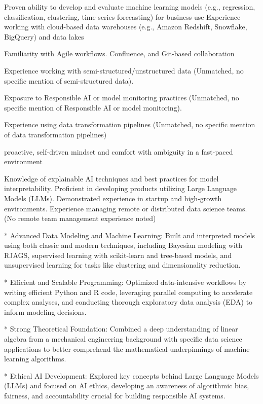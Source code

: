 
Proven ability to develop and evaluate machine learning models (e.g., regression, classification, clustering, time-series forecasting) for business use
Experience working with cloud-based data warehouses (e.g., Amazon Redshift, Snowflake, BigQuery) and data lakes

Familiarity with Agile workflows. Confluence, and Git-based collaboration

Experience working with semi-structured/unstructured data (Unmatched, no specific mention of semi-structured data).

Exposure to Responsible AI or model monitoring practices (Unmatched, no specific mention of Responsible AI or model monitoring).

Experience using data transformation pipelines (Unmatched, no specific mention of data transformation pipelines)

proactive, self-driven mindset and comfort with ambiguity in a fast-paced environment

Knowledge of explainable AI techniques and best practices for model interpretability. Proficient in developing products utilizing Large Language Models (LLMs). Demonstrated experience in startup and high-growth environments. Experience managing remote or distributed data science teams. (No remote team management experience noted)


 * Advanced Data Modeling and Machine Learning: Built and interpreted models using both classic and modern techniques, including Bayesian modeling with RJAGS, supervised learning with scikit-learn and tree-based models, and unsupervised learning for tasks like clustering and dimensionality reduction.
 
 * Efficient and Scalable Programming: Optimized data-intensive workflows by writing efficient Python and R code, leveraging parallel computing to accelerate complex analyses, and conducting thorough exploratory data analysis (EDA) to inform modeling decisions.
 
 * Strong Theoretical Foundation: Combined a deep understanding of linear algebra from a mechanical engineering background with specific data science applications to better comprehend the mathematical underpinnings of machine learning algorithms.
 
 * Ethical AI Development: Explored key concepts behind Large Language Models (LLMs) and focused on AI ethics, developing an awareness of algorithmic bias, fairness, and accountability crucial for building responsible AI systems.
